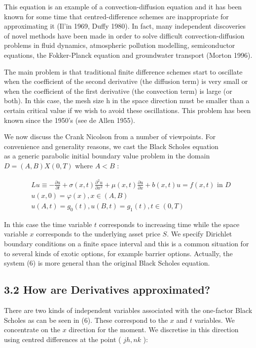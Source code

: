 \documentclass[10pt]{article}
\begin{document}
This equation is an example of a convection-diffusion equation and it has been known for some time that centred-difference schemes are inappropriate for approximating it (Il'in 1969, Duffy 1980). In fact, many independent discoveries of novel methods have been made in order to solve difficult convection-diffusion problems in fluid dynamics, atmospheric pollution modelling, semiconductor equations, the Fokker-Planck equation and groundwater transport (Morton 1996).

The main problem is that traditional finite difference schemes start to oscillate when the coefficient of the second derivative (the diffusion term) is very small or when the coefficient of the first derivative (the convection term) is large (or both). In this case, the mesh size h in the space direction must be smaller than a certain critical value if we wish to avoid these oscillations. This problem has been known since the 1950's (see de Allen 1955).

We now discuss the Crank Nicolson from a number of viewpoints. For convenience and generality reasons, we cast the Black Scholes equation\\
as a generic parabolic initial boundary value problem in the domain $D=(A, B) X(0, T)$ where $A<B$ :


\begin{align*}
& L u \equiv-\frac{\partial u}{\partial t}+\sigma(x, t) \frac{\partial^{2} u}{\partial x^{2}}+\mu(x, t) \frac{\partial u}{\partial x}+b(x, t) u=f(x, t) \text { in } D \\
& u(x, 0)=\varphi(x), x \in(A, B)  \tag{6}\\
& u(A, t)=g_{0}(t), u(B, t)=g_{1}(t), t \in(0, T)
\end{align*}


In this case the time variable $t$ corresponds to increasing time while the space variable $x$ corresponds to the underlying asset price $S$. We specify Dirichlet boundary conditions on a finite space interval and this is a common situation for to several kinds of exotic options, for example barrier options. Actually, the system (6) is more general than the original Black Scholes equation.

\subsection*{3.2 How are Derivatives approximated?}
There are two kinds of independent variables associated with the one-factor Black Scholes as can be seen in (6). These correspond to the $x$ and $t$ variables. We concentrate on the $x$ direction for the moment. We discretise in this direction using centred differences at the point ( $j h, n k$ ):
\end{document}
